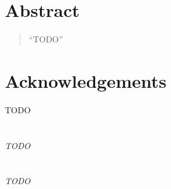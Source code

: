 
\chapter*{Abstract}
\thispagestyle{empty}

\begin{quote}
``TODO''
\end{quote}


\cleardoublepage %
\chapter*{Acknowledgements}

TODO

\thispagestyle{empty}
\vspace{1cm}



\cleardoublepage %
\chapter*{}
\setlength{\leftmargin}{0.5\textwidth}
\setlength{\parsep}{0cm}
\addtolength{\topsep}{0.5cm}
\begin{flushright}
\small\em{
TODO
}
\end{flushright}


\cleardoublepage %
\chapter*{}
\setlength{\leftmargin}{0.5\textwidth}
\setlength{\parsep}{0cm}
\addtolength{\topsep}{0.5cm}
\begin{flushright}
\small\em{
TODO
}
\end{flushright}
\begin{flushright}
\small{

}
\end{flushright}
\cleardoublepage %
